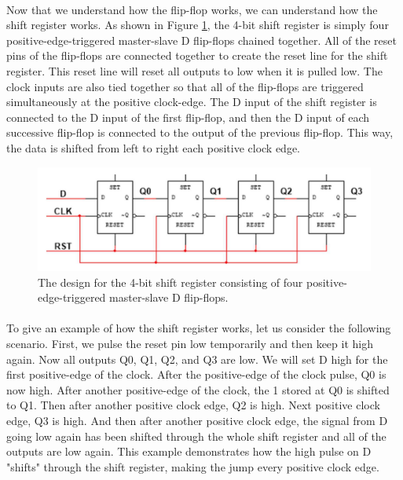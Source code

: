 \documentclass{article}
\begin{document}
  \paragraph{}
  Now that we understand how the flip-flop works, we can understand how the shift register works. As shown in Figure \ref{fig:shift-reg-design}, the 4-bit shift register is simply four positive-edge-triggered master-slave D flip-flops chained together. All of the reset pins of the flip-flops are connected together to create the reset line for the shift register. This reset line will reset all outputs to low when it is pulled low. The clock inputs are also tied together so that all of the flip-flops are triggered simultaneously at the positive clock-edge. The D input of the shift register is connected to the D input of the first flip-flop, and then the D input of each successive flip-flop is connected to the output of the previous flip-flop. This way, the data is shifted from left to right each positive clock edge.


  \begin{figure}[H]
    \centering
    \includegraphics[width=0.8\linewidth, frame]{images/shift-reg-design.png}
    \caption{The design for the 4-bit shift register consisting of four positive-edge-triggered master-slave D flip-flops.}
    \label{fig:shift-reg-design}
  \end{figure}

  \paragraph{}
  To give an example of how the shift register works, let us consider the following scenario. First, we pulse the reset pin low temporarily and then keep it high again. Now all outputs Q0, Q1, Q2, and Q3 are low. We will set D high for the first positive-edge of the clock. After the positive-edge of the clock pulse, Q0 is now high. After another positive-edge of the clock, the 1 stored at Q0 is shifted to Q1. Then after another positive clock edge, Q2 is high. Next positive clock edge, Q3 is high. And then after another positive clock edge, the signal from D going low again has been shifted through the whole shift register and all of the outputs are low again. This example demonstrates how the high pulse on D "shifts" through the shift register, making the jump every positive clock edge.
\end{document}
